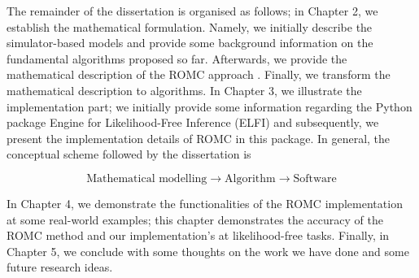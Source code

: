 The remainder of the dissertation is organised as follows; in Chapter
2, we establish the mathematical formulation. Namely, we initially
describe the simulator-based models and provide some background
information on the fundamental algorithms proposed so far. Afterwards,
we provide the mathematical description of the ROMC approach
\autocite{Ikonomov2019}. Finally, we transform the mathematical
description to algorithms. In Chapter 3, we illustrate the
implementation part; we initially provide some information regarding
the Python package Engine for Likelihood-Free Inference (ELFI)
\autocite{1708.00707} and subsequently, we present the implementation
details of ROMC in this package. In general, the conceptual scheme
followed by the dissertation is

$$\text{Mathematical modelling} \rightarrow
\text{Algorithm} \rightarrow \text{Software}$$

In Chapter 4, we demonstrate the functionalities of the ROMC
implementation at some real-world examples; this chapter demonstrates
the accuracy of the ROMC method and our implementation's at
likelihood-free tasks. Finally, in Chapter 5, we conclude with some
thoughts on the work we have done and some future research ideas.
